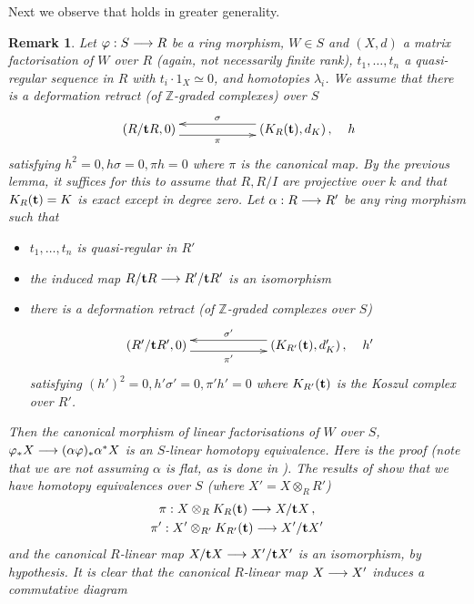\documentclass[english,letter paper,12pt,leqno]{article}
\theoremstyle{example}
\newtheorem{remark}[theorem]{Remark}
\numberwithin{equation}{section}
\def\be{\begin{equation}}
\def\ee{\end{equation}}
\begin{document}
Next we observe that \cite[Remark 7.7]{pushforward} holds in greater generality. %

\begin{remark}\label{remark:fixing_dm} Let $\varphi: S \longrightarrow R$ be a ring morphism, $W \in S$ and $(X,d)$ a matrix factorisation of $W$ over $R$ (again, not necessarily finite rank), $t_1,\ldots,t_n$ a quasi-regular sequence in $R$ with $t_i \cdot 1_X \simeq 0$, and homotopies $\lambda_i$. We assume that there is a deformation retract (of $\mathbb{Z}$-graded complexes) over $S$
\be\label{eq:fixing_dm_1}
\xymatrix@C+3pc{
(R/\bold{t} R,0) \ar@<-1ex>[r]_-\pi & (K_R(\bold{t}),d_K)\,, \ar@<-1ex>[l]_-\sigma
}\quad h
\ee
satisfying $h^2 = 0, h \sigma = 0, \pi h = 0$ where $\pi$ is the canonical map. By the previous lemma, it suffices for this to assume that $R,R/I$ are projective over $k$ and that $K_R(\bold{t}) = K$ is exact except in degree zero. Let $\alpha: R \longrightarrow R'$ be any ring morphism such that
\begin{itemize}
\item $t_1,\ldots,t_n$ is quasi-regular in $R'$
\item the induced map $R/\bold{t} R \longrightarrow R'/\bold{t} R'$ is an isomorphism
\item there is a deformation retract (of $\mathbb{Z}$-graded complexes over $S$)
\be\label{eq:fixing_dm_2}
\xymatrix@C+3pc{
(R'/\bold{t} R',0) \ar@<-1ex>[r]_-{\pi'} & (K_{R'}(\bold{t}), d'_K)\,, \ar@<-1ex>[l]_-{\sigma'}
}\quad h'
\ee
satisfying $(h')^2 = 0, h'\sigma' = 0, \pi' h' = 0$ where $K_{R'}(\bold{t})$ is the Koszul complex over $R'$.
\end{itemize}
Then the canonical morphism of linear factorisations of $W$ over $S$, $\varphi_* X \longrightarrow (\alpha \varphi)_* \alpha^* X$ is an $S$-linear homotopy equivalence. Here is the proof (note that we are not assuming $\alpha$ is flat, as is done in \cite[Remark 7.7]{pushforward}). The results of \cite{pushforward} show that we have homotopy equivalences over $S$ (where $X' = X \otimes_R R'$)
\begin{gather*}
\pi: X \otimes_R K_R(\bold{t}) \longrightarrow X/\bold{t} X\,,\\
\pi': X' \otimes_{R'} K_{R'}(\bold{t}) \longrightarrow X'/\bold{t} X'
\end{gather*}
and the canonical $R$-linear map $X/\bold{t} X \longrightarrow X'/\bold{t} X'$ is an isomorphism, by hypothesis. It is clear that the canonical $R$-linear map $X \longrightarrow X'$ induces a commutative diagram

\end{remark}
\end{document}
